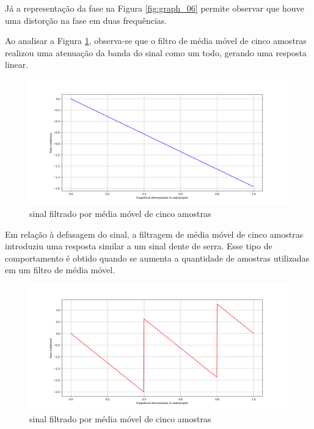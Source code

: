 Já a representação da fase na Figura \ref{fig:graph_06} permite observar que houve uma distorção na fase em duas frequências. 

Ao analisar a Figura \ref{fig:graph_07}, observa-se que o filtro de média móvel de cinco amostras realizou uma atenuação da banda do sinal como um todo, gerando uma resposta linear. 

\begin{figure}[!htb]
    \centering
    \includegraphics[width=\linewidth]{Imagens/fig07.png}
    \caption{sinal filtrado por média móvel de cinco amostras}
    \label{fig:graph_07}
\end{figure}

Em relação à defasagem do sinal, a filtragem de média móvel de cinco amostras introduziu uma resposta similar a um sinal dente de serra. Esse tipo de comportamento é obtido quando se aumenta a quantidade de amostras utilizadas em um filtro de média móvel.

\begin{figure}[!htb]
    \centering
    \includegraphics[width=\linewidth]{Imagens/fig08.png}
    \caption{sinal filtrado por média móvel de cinco amostras}
    \label{fig:graph_08}
\end{figure}
